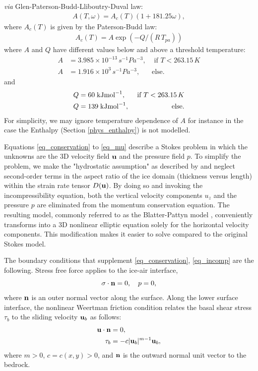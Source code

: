 \documentclass[10pt,twocolumn]{article}
\begin{document}
\textit{via} Glen-Paterson-Budd-Lliboutry-Duval law:
\begin{align}
A(T,\omega)= A_c(T)(1+181.25 \omega), \label{defA}
\end{align}
where $A_c(T)$ is given by the Paterson-Budd law:
\begin{align}
A_c(T)= A \exp{ ( -Q / (R \, T_{pa}) )}
\end{align}
where $A$ and $Q$ have different values below and above a threshold temperature:
\begin{align}
A & = 3.985 \times 10^{-13} \, s^{-1} Pa^{-3}, & \textrm{ if } T <263.15 \, K \label{A1} \\
A & = 1.916 \times 10^3 \, s^{-1} Pa^{-3}, & \textrm{else.} \label{A2} 
\end{align}
and
\begin{align}
Q & =  60 \; {\rm kJ mol}^{-1}, & \textrm{ if } T <263.15 \, K \\
Q & = 139 \; {\rm kJ mol}^{-1}, & \textrm{else.}
\end{align}
For simplicity, we may ignore temperature dependence of $A$ for instance in the 
case the Enthalpy (Section \ref{phys_enthalpy}) is not modelled.
 
Equations \eqref{eq_conservation} to \eqref{eq_mu} describe a Stokes problem in which 
the unknowns are the 3D velocity field ${\bf u}$ and the pressure field $p$. 
To simplify the problem, we make the "hydrostatic assumption" as described by  \citep{Blatter1995}
and neglect second-order terms in the aspect ratio of the ice domain (thickness versus length) 
within the strain rate tensor $D({\bf u})$. By doing so and invoking the incompressibility equation, 
both the vertical velocity components $u_z$ and the pressure $p$ are eliminated from the 
momentum conservation equation.
The resulting model, commonly referred to as the Blatter-Pattyn model
\citep{Blatter1995}, conveniently transforms into a 3D nonlinear elliptic equation solely 
for the horizontal velocity components. This modification makes it easier to solve compared 
to the original Stokes model.

The boundary conditions that supplement \eqref{eq_conservation}, \eqref{eq_incomp} 
are the following. Stress free force applies to the ice-air interface,
\begin{equation}
\sigma \cdot {\bf n} = 0, \quad p = 0,  \label{BC_FS}
\end{equation}
where ${\bf n}$
is an outer normal vector along the surface. Along the lower surface interface, 
the nonlinear Weertman friction condition \citep[e.g.,][]{SchoofHewitt2013}
relates the basal shear stress $\tau_b$ to the sliding velocity ${\bf u}_b$ as follows:
\begin{align}
{\bf u} \cdot {\bf n} &= 0,  \label{BC_slip1} \\ 
\tau_b & = -  c |{\bf u}_b|^{m-1} {\bf u}_b, \label{BC_slip2a}
\end{align} 
where $m>0$, $c=c(x,y) > 0$, and ${\bf n}$ is the outward normal unit vector to the bedrock.
\end{document}
